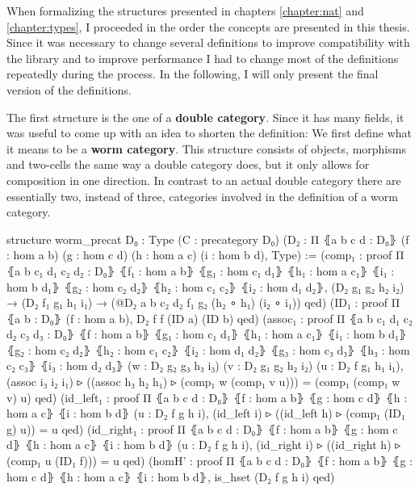 When formalizing the structures presented in chapters \ref{chapter:nat} and
\ref{chapter:types}, I proceeded in the order the concepts are presented in this
thesis.
Since it was necessary to change several definitions to improve compatibility with
the library and to improve performance I had to change most of the definitions
repeatedly during the process.
In the following, I will only present the final version of the definitions.

The first structure is the one of a \textbf{double category}.
Since it has many fields, it was useful to come up with an idea to shorten the definition:
We first define what it means to be a \textbf{worm category}.
This structure consists of objects, morphisms and two-cells the same way a double
category does, but it only allows for composition in one direction.
In contrast to an actual double category there are essentially two, instead of
three, categories involved in the definition of a worm category.
\begin{leancodebr}
structure worm_precat {D₀ : Type} (C  : precategory D₀)
  (D₂ : Π ⦃a b c d : D₀⦄
    (f : hom a b) (g : hom c d) (h : hom a c) (i : hom b d), Type) :=
  (comp₁ : proof Π ⦃a b c₁ d₁ c₂ d₂ : D₀⦄
    ⦃f₁ : hom a b⦄ ⦃g₁ : hom c₁ d₁⦄ ⦃h₁ : hom a c₁⦄ ⦃i₁ : hom b d₁⦄
    ⦃g₂ : hom c₂ d₂⦄ ⦃h₂ : hom c₁ c₂⦄ ⦃i₂ : hom d₁ d₂⦄,
    (D₂ g₁ g₂ h₂ i₂) → (D₂ f₁ g₁ h₁ i₁)
    → (@D₂ a b c₂ d₂ f₁ g₂ (h₂ ∘ h₁) (i₂ ∘ i₁)) qed)
  (ID₁ : proof Π ⦃a b : D₀⦄ (f : hom a b), D₂ f f (ID a) (ID b) qed)
  (assoc₁ : proof Π ⦃a b c₁ d₁ c₂ d₂ c₃ d₃ : D₀⦄
    ⦃f  : hom a b⦄   ⦃g₁ : hom c₁ d₁⦄ ⦃h₁ : hom a c₁⦄ ⦃i₁ : hom b d₁⦄
    ⦃g₂ : hom c₂ d₂⦄ ⦃h₂ : hom c₁ c₂⦄ ⦃i₂ : hom d₁ d₂⦄
    ⦃g₃ : hom c₃ d₃⦄ ⦃h₃ : hom c₂ c₃⦄ ⦃i₃ : hom d₂ d₃⦄
    (w : D₂ g₂ g₃ h₃ i₃) (v : D₂ g₁ g₂ h₂ i₂) (u : D₂ f g₁ h₁ i₁),
    (assoc i₃ i₂ i₁) ▹ ((assoc h₃ h₂ h₁) ▹
        (comp₁ w (comp₁ v u))) = (comp₁ (comp₁ w v) u) qed)
  (id_left₁ : proof Π ⦃a b c d : D₀⦄
    ⦃f : hom a b⦄ ⦃g : hom c d⦄ ⦃h : hom a c⦄ ⦃i : hom b d⦄
    (u : D₂ f g h i),
    (id_left i) ▹ ((id_left h) ▹ (comp₁ (ID₁ g) u)) = u qed)
  (id_right₁ : proof Π ⦃a b c d : D₀⦄
    ⦃f : hom a b⦄ ⦃g : hom c d⦄ ⦃h : hom a c⦄ ⦃i : hom b d⦄
    (u : D₂ f g h i),
    (id_right i) ▹ ((id_right h) ▹ (comp₁ u (ID₁ f))) = u qed)
  (homH' : proof Π ⦃a b c d : D₀⦄
    ⦃f : hom a b⦄ ⦃g : hom c d⦄ ⦃h : hom a c⦄ ⦃i : hom b d⦄,
    is_hset (D₂ f g h i) qed)
\end{leancodebr}

